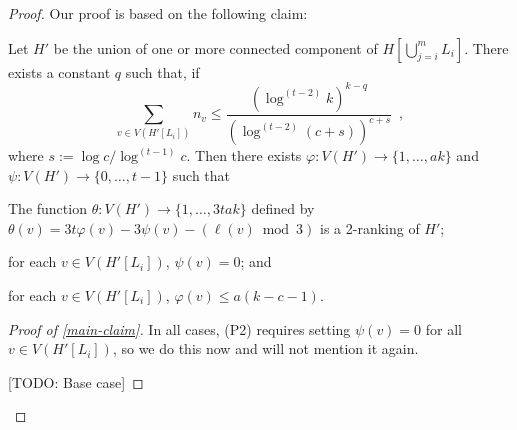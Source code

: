 \documentclass[kpfonts]{patmorin}
\DeclareMathOperator{\stw}{stw}
\theoremstyle{named}
\begin{document}
\begin{proof}
Our proof is based on the following claim:

    \begin{clm}\label{main-claim}
        Let $H'$ be the union of one or more connected component of $H[\bigcup_{j=i}^m L_i]$. There exists a constant $q$ such that,  if
        \begin{equation}
            \sum_{v\in V(H'[L_i])} n_v\le \frac{(\log^{(t-2)} k)^{k-q}}{(\log^{(t-2)} (c+s))^{c+s}} \enspace , \label{main-size}
        \end{equation}
        where $s:=\log c/\log^{(t-1)} c$.
        Then there exists $\varphi:V(H')\to\{1,\ldots,ak\}$ and $\psi:V(H')\to\{0,\ldots,t-1\}$ such that
        \begin{compactenum}[(P1)]
            \item The function $\theta:V(H')\to\{1,\ldots,3tak\}$ defined by $\theta(v)=3t\varphi(v) - 3\psi(v) -(\ell(v)\bmod 3)$ is a 2-ranking of $H'$;
            \item for each $v\in V(H'[L_i])$, $\psi(v)=0$; and
            \item for each $v\in V(H'[L_i])$, $\varphi(v)\le a(k-c-1)$.
        \end{compactenum}
    \end{clm}

    \begin{proof}[Proof of \cref{main-claim}]
        In all cases, (P2) requires setting $\psi(v)=0$ for all $v\in V(H'[L_i])$, so we do this now and will not mention it again.

        [TODO: Base case]


\end{proof}
\end{proof}
\end{document}
